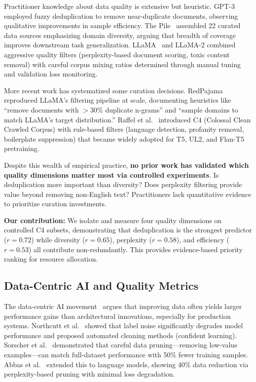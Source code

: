Practitioner knowledge about data quality is extensive but heuristic. GPT-3~\cite{brown2020language} employed fuzzy deduplication to remove near-duplicate documents, observing qualitative improvements in sample efficiency. The Pile~\cite{gao2020pile} assembled 22 curated data sources emphasizing domain diversity, arguing that breadth of coverage improves downstream task generalization. LLaMA~\cite{touvron2023llama} and LLaMA-2 combined aggressive quality filters (perplexity-based document scoring, toxic content removal) with careful corpus mixing ratios determined through manual tuning and validation loss monitoring.

More recent work has systematized some curation decisions. RedPajama~\cite{computer2023redpajama} reproduced LLaMA's filtering pipeline at scale, documenting heuristics like ``remove documents with $>30\%$ duplicate n-grams'' and ``sample domains to match LLaMA's target distribution.'' Raffel et al.~\cite{raffel2020exploring} introduced C4 (Colossal Clean Crawled Corpus) with rule-based filters (language detection, profanity removal, boilerplate suppression) that became widely adopted for T5, UL2, and Flan-T5 pretraining.

Despite this wealth of empirical practice, \textbf{no prior work has validated which quality dimensions matter most via controlled experiments}. Is deduplication more important than diversity? Does perplexity filtering provide value beyond removing non-English text? Practitioners lack quantitative evidence to prioritize curation investments.

\textbf{Our contribution:} We isolate and measure four quality dimensions on controlled C4 subsets, demonstrating that deduplication is the strongest predictor ($r = 0.72$) while diversity ($r = 0.65$), perplexity ($r = 0.58$), and efficiency ($r = 0.53$) all contribute non-redundantly. This provides evidence-based priority ranking for resource allocation.

\subsection{Data-Centric AI and Quality Metrics}

The data-centric AI movement~\cite{ng2021data,mazumder2022data} argues that improving data often yields larger performance gains than architectural innovations, especially for production systems. Northcutt et al.~\cite{northcutt2021pervasive} showed that label noise significantly degrades model performance and proposed automated cleaning methods (confident learning). Sorscher et al.~\cite{sorscher2022beyond} demonstrated that careful data pruning---removing low-value examples---can match full-dataset performance with 50\% fewer training samples. Abbas et al.~\cite{abbas2023semdedup} extended this to language models, showing 40\% data reduction via perplexity-based pruning with minimal loss degradation.

